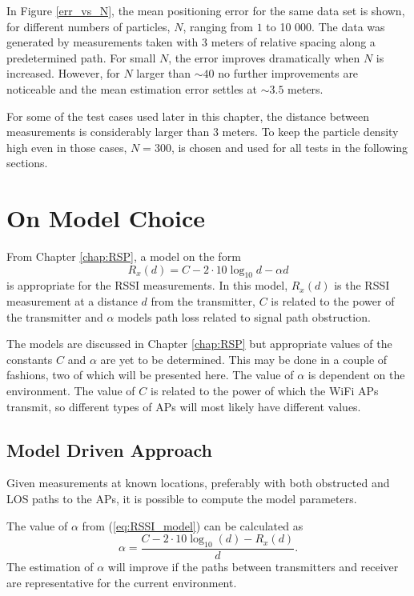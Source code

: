 \documentclass{LTHthesis}
\begin{document}
In Figure \ref{err_vs_N}, the mean positioning error for the same data set is shown, for different numbers of particles, $N$, ranging from $1$ to 10 000. The data was generated by measurements taken with 3 meters of relative spacing along a predetermined path. For small $N$, the error improves dramatically when $N$ is increased. However, for $N$ larger than $\sim 40$ no further improvements are noticeable and the mean estimation error settles at $\sim 3.5$ meters. 

For some of the test cases used later in this chapter, the distance between measurements is considerably larger than 3 meters. To keep the particle density high even in those cases, $N=300$, is chosen and used for all tests in the following sections.    
%
\section{On Model Choice}
%
From Chapter \ref{chap:RSP}, a model on the form
%
\begin{equation}
R_x(d) = C - 2\cdot10\log_{10}{d}-\alpha d
\label{eq:RSSI_model}
\end{equation}
%
is appropriate for the RSSI measurements. In this model, $R_x(d)$ is the RSSI measurement at a distance $d$ from the transmitter, $C$ is related to the power of the transmitter and $\alpha$ models path loss related to signal path obstruction. 

The models are discussed in Chapter \ref{chap:RSP} but appropriate values of the constants $C$ and $\alpha$ are yet to be determined. This may be done in a couple of fashions, two of which will be presented here. The value of $\alpha$ is dependent on the environment. The value of $C$ is related to the power of which the WiFi APs transmit, so different types of APs will most likely have different values.

\subsection{Model Driven Approach}
%
Given measurements at known locations, preferably with both obstructed and LOS paths to the APs, it is possible to compute the model parameters.

The value of $\alpha$ from (\ref{eq:RSSI_model}) can be calculated as
%
\begin{equation}
\alpha = \frac{C-2\cdot10\log_{10}(d)-R_x(d)}{d}.
\end{equation}
%
The estimation of $\alpha$ will improve if the paths between transmitters and receiver are representative for the current environment.  
\end{document}
